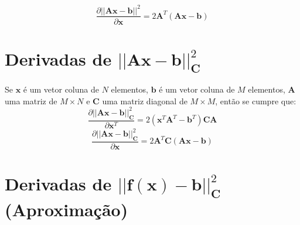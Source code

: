 \begin{corollaryT}
\begin{equation}
\frac{\partial ||\mathbf{A}\mathbf{x}-\mathbf{b}||^2}{\partial \mathbf{x} }=
2 \mathbf{A}^{T}\left(\mathbf{A}\mathbf{x}-\mathbf{b}\right)
\end{equation}
\end{corollaryT}
\section{Derivadas de $||\mathbf{A}\mathbf{x}-\mathbf{b}||_{\mathbf{C}}^2$ 
}


\begin{theorem}
Se $\mathbf{x}$ é um vetor coluna de $N$ elementos,
$\mathbf{b}$ é um vetor coluna de $M$ elementos, 
$\mathbf{A}$ uma matriz de $M\times N$ e
$\mathbf{C}$ uma matriz diagonal de $M \times M$, então se cumpre que:
\begin{equation}
\frac{\partial ||\mathbf{A}\mathbf{x}-\mathbf{b}||_{\mathbf{C}}^2}{\partial \mathbf{x}^{T}}=
2\left(\mathbf{x}^{T}\mathbf{A}^{T}- \mathbf{b}^{T} \right)\mathbf{C}\mathbf{A}
\end{equation}
\begin{equation}
\frac{\partial ||\mathbf{A}\mathbf{x}-\mathbf{b}||_{\mathbf{C}}^2}{\partial \mathbf{x} }=
2 \mathbf{A}^{T}\mathbf{C}\left(\mathbf{A}\mathbf{x}-\mathbf{b}\right)
\end{equation}
\end{theorem}

\section{Derivadas de $||\mathbf{f}(\mathbf{x})-\mathbf{b}||_{\mathbf{C}}^2$  
(Aproximação)
}

